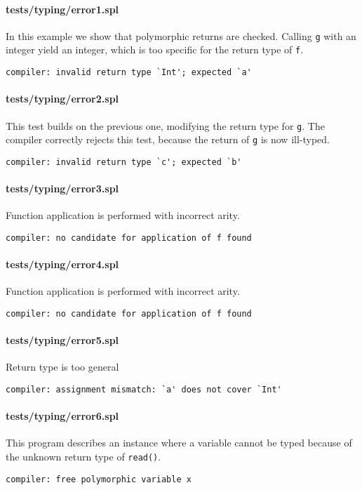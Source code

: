 \documentclass[a4paper]{article}
\begin{document}
\paragraph{tests/typing/error1.spl}
In this example we show that polymorphic returns are checked.
Calling \verb|g| with an integer yield an integer, which is too specific for the return type of \verb|f|.
    \begin{verbatim}
compiler: invalid return type `Int'; expected `a'\end{verbatim}

\paragraph{tests/typing/error2.spl}
This test builds on the previous one, modifying the return type for \verb|g|.
The compiler correctly rejects this test, because the return of \verb|g| is now ill-typed.
    \begin{verbatim}
compiler: invalid return type `c'; expected `b'\end{verbatim}

\paragraph{tests/typing/error3.spl}
Function application is performed with incorrect arity.
    \begin{verbatim}
compiler: no candidate for application of f found\end{verbatim}

\paragraph{tests/typing/error4.spl}
Function application is performed with incorrect arity.
    \begin{verbatim}
compiler: no candidate for application of f found\end{verbatim}

\paragraph{tests/typing/error5.spl}
Return type is too general
    \begin{verbatim}
compiler: assignment mismatch: `a' does not cover `Int'\end{verbatim}

\paragraph{tests/typing/error6.spl}
This program describes an instance where a variable cannot be typed because of the unknown return type of \verb|read()|.
    \begin{verbatim}
compiler: free polymorphic variable x\end{verbatim}
\end{document}
